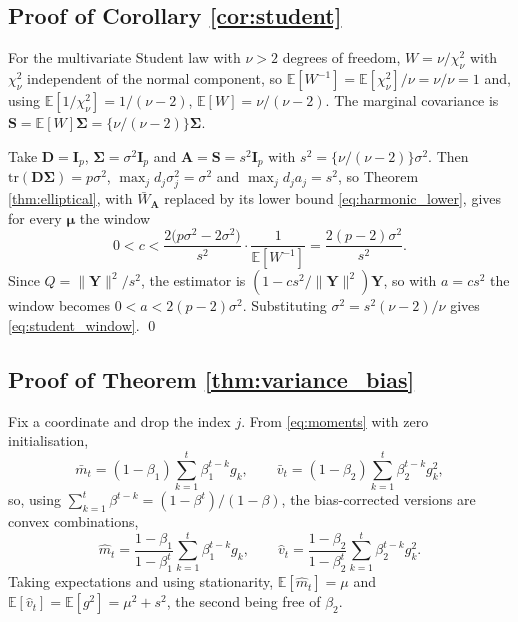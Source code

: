 \documentclass[pdflatex,sn-mathphys-num]{sn-jnl}%
\theoremstyle{thmstyleone}%
\theoremstyle{thmstyletwo}%
\theoremstyle{thmstylethree}%
\newcommand{\rev}[1]{{\color{blue}#1}}
\newcommand{\tr}{\mathrm{tr}}
\newcommand{\E}{\mathbb{E}}
\begin{document}
\begin{appendices}
\subsection*{Proof of Corollary \ref{cor:student}}

For the multivariate Student law with $\nu>2$ degrees of freedom, $W=\nu/\chi^2_\nu$ with $\chi^2_\nu$ independent of the normal component, so $\E[W^{-1}]=\E[\chi^2_\nu]/\nu=\nu/\nu=1$ and, using $\E[1/\chi^2_\nu]=1/(\nu-2)$, $\E[W]=\nu/(\nu-2)$. The marginal covariance is $\bm S=\E[W]\bm\Sigma=\{\nu/(\nu-2)\}\bm\Sigma$.

Take $\bm D=\bm I_p$, $\bm\Sigma=\sigma^2\bm I_p$ and $\bm A=\bm S=s^2\bm I_p$ with $s^2=\{\nu/(\nu-2)\}\sigma^2$. Then $\tr(\bm D\bm\Sigma)=p\sigma^2$, $\max_jd_j\sigma^2_j=\sigma^2$ and $\max_jd_ja_j=s^2$, so \rev{Theorem \ref{thm:elliptical}, with $\bar W_{\bm A}$ replaced by its lower bound \eqref{eq:harmonic_lower}, gives for every $\bm\mu$ the window}
\begin{equation}
0<c<\frac{2\bigl(p\sigma^2-2\sigma^2\bigr)}{s^2}\cdot\frac{1}{\E[W^{-1}]}
=\frac{2(p-2)\sigma^2}{s^2} .
\end{equation}
Since $Q=\|\bm Y\|^2/s^2$, the estimator is $(1-cs^2/\|\bm Y\|^2)\bm Y$, so with $a=cs^2$ the window becomes $0<a<2(p-2)\sigma^2$. Substituting $\sigma^2=s^2(\nu-2)/\nu$ gives \eqref{eq:student_window}. \qed

\subsection*{Proof of Theorem \ref{thm:variance_bias}}

Fix a coordinate and drop the index $j$. From \eqref{eq:moments} with zero initialisation,
\begin{equation}
\bar m_t=(1-\beta_1)\sum_{k=1}^{t}\beta_1^{t-k}g_k,
\qquad
\bar v_t=(1-\beta_2)\sum_{k=1}^{t}\beta_2^{t-k}g^2_k ,
\end{equation}
so, using $\sum_{k=1}^{t}\beta^{t-k}=(1-\beta^{t})/(1-\beta)$, the bias-corrected versions are convex combinations,
\begin{equation}
\hat m_t=\frac{1-\beta_1}{1-\beta_1^{t}}\sum_{k=1}^{t}\beta_1^{t-k}g_k,
\qquad
\hat v_t=\frac{1-\beta_2}{1-\beta_2^{t}}\sum_{k=1}^{t}\beta_2^{t-k}g^2_k .
\end{equation}
Taking expectations and using stationarity, $\E[\hat m_t]=\mu$ and $\E[\hat v_t]=\E[g^2]=\mu^2+s^2$, the second being free of $\beta_2$.


\end{appendices}
\end{document}
